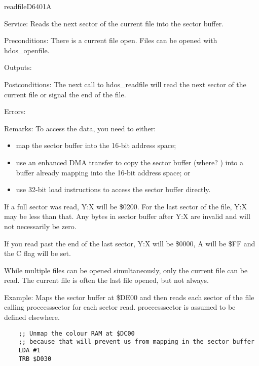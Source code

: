 \newpage
\begin{hyppotrap}{readfile}{D640}{1A}
\item [Service:]
  Reads the next sector of the current file into the sector buffer.
\item [Preconditions:]
  There is a current file open. Files can be opened with hdos\_openfile.
\item [Outputs:]
\item [Postconditions:]
  The next call to hdos\_readfile will read the next sector of the current file
  or signal the end of the file.
\item [Errors:]
  \TODO
\item [Remarks:]
  To access the data, you need to either:
  \begin{itemize}
    \item map the sector buffer into the 16-bit address space;
    \item use an enhanced DMA transfer to copy the sector buffer (where? \TODO)
          into a buffer already mapping into the 16-bit address space; or
    \item use 32-bit load instructions to access the sector buffer directly.
  \end{itemize}

  If a full sector was read, Y:X will be \$0200. For the last sector of the
  file, Y:X may be less than that. Any bytes in sector buffer after Y:X are
  invalid and will not necessarily be zero.

  If you read past the end of the last sector, Y:X will be \$0000, A will be
  \$FF and the C flag will be set.

  While multiple files can be opened simultaneously, only the current file can
  be read. The current file is often the last file opened, but not always.
\item [Example:]
  Maps the sector buffer at \$DE00 and then reads each sector of the file calling
  proccesssector for each sector read. proccesssector is assumed to be defined
  elsewhere.
\begin{tcolorbox}[colback=black,coltext=white]
\verbatimfont{\codefont}
\begin{verbatim}
    ;; Unmap the colour RAM at $DC00
    ;; because that will prevent us from mapping in the sector buffer
    LDA #1
    TRB $D030
\end{verbatim}
\end{tcolorbox}


\end{hyppotrap}
